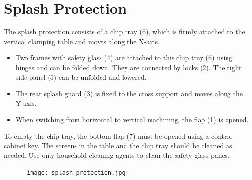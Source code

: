 
\section{Splash Protection}

\setcounter{section}{24}

The splash protection consists of a chip tray (6), which is firmly attached to the vertical clamping table and moves along the X-axis.

\begin{itemize}
    \item Two frames with safety glass (4) are attached to this chip tray (6) using hinges and can be folded down. They are connected by locks (2). The right side panel (5) can be unfolded and lowered.
    \item The rear splash guard (3) is fixed to the cross support and moves along the Y-axis.
    \item When switching from horizontal to vertical machining, the flap (1) is opened.
\end{itemize}


\noindent To empty the chip tray, the bottom flap (7) must be opened using a control cabinet key. The screens in the table and the chip tray should be cleaned as needed. Use only household cleaning agents to clean the safety glass panes.

\vspace{.5cm}


\begin{figure}[h]
    \centering
    \texttt{[image: splash\_protection.jpg]}
\end{figure}

